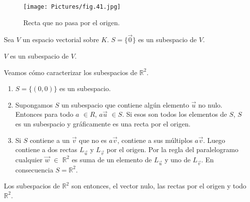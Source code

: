 \begin{figure}
    \centering
    \texttt{[image: Pictures/fig.41.jpg]}
   \caption{Recta que no pasa por el origen. }
    \label{rectanon}
\end{figure}
   



\begin{example}
Sea $V$ un espacio vectorial sobre $K$. $S=\{\vec{0}\}$ es un subespacio de $V$.
\end{example}
\begin{example}
$V$ es un subespacio de $V$.
\end{example}




\begin{example}
Veamos cómo  caracterizar los subespacios de $\mathbb{R}^2$.
\begin{enumerate}
\item
$S=\{(0,0)\}$ es un subespacio.

\item 
Supongamos $S$ un subespacio que contiene algún elemento $\vec{u}$ no nulo. Entonces para todo $a$ $\in R$, $a\vec{u}$ $\in S$. Si esos son todos los elementos de $S$, $S$ es un subespacio y gráficamente es una recta por el origen.

\item 

Si $S$ contiene a un $ \vec{v}$ que no es $a \vec{v}$, contiene a sus múltiplos $a \vec{v}$. 
Luego contiene a dos rectas $L_{\vec{u}}$ y $L_{\vec{v}}$ por el origen. Por la regla del paralelogramo cualquier $\vec{w}$ $\in$ $\mathbb{R}^2$ es suma de un elemento de $L_{\vec{u}}$ y uno de $L_{\vec{v}}$. En consecuencia $S=\mathbb{R}^2$.
\end{enumerate}

\bigskip

Los subespacios de $\mathbb{R}^2$ son entonces, el vector nulo, las rectas por el origen y todo $\mathbb{R}^2$.
\end{example}

